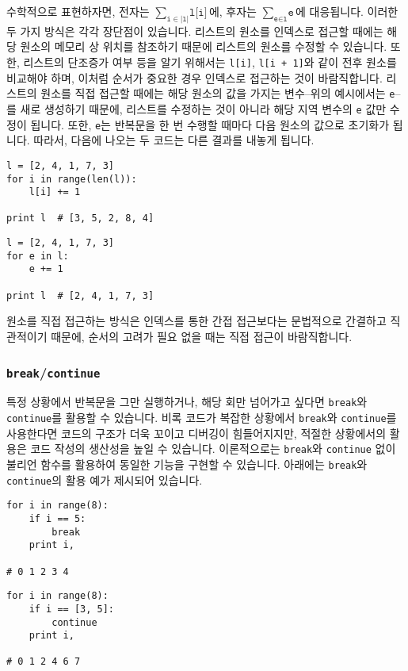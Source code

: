 \documentclass[../main.tex]{subfiles}
\begin{document}
수학적으로 표현하자면, 전자는 $\sum_{\texttt{i} \in |\texttt{l}|} \texttt{l[i]}$에, 후자는 $\sum_{\texttt{e} \in \texttt{l}} \texttt{e}$에 대응됩니다. 이러한 두 가지 방식은 각각 장단점이 있습니다.
리스트의 원소를 인덱스로 접근할 때에는 해당 원소의 메모리 상 위치를 참조하기 때문에 리스트의 원소를 수정할 수 있습니다.
또한, 리스트의 단조증가 여부 등을 알기 위해서는 \texttt{l[i]}, \texttt{l[i + 1]}와 같이 전후 원소를 비교해야 하며, 이처럼 순서가 중요한 경우 인덱스로 접근하는 것이 바람직합니다.
리스트의 원소를 직접 접근할 때에는 해당 원소의 값을 가지는 변수--위의 예시에서는 \texttt{e}--를 새로 생성하기 때문에, 리스트를 수정하는 것이 아니라 해당 지역 변수의 \texttt{e} 값만 수정이 됩니다.
또한, \texttt{e}는 반복문을 한 번 수행할 때마다 다음 원소의 값으로 초기화가 됩니다.
따라서, 다음에 나오는 두 코드는 다른 결과를 내놓게 됩니다.
\begin{verbatim}
l = [2, 4, 1, 7, 3]
for i in range(len(l)):
	l[i] += 1

print l  # [3, 5, 2, 8, 4]
\end{verbatim}
\begin{verbatim}
l = [2, 4, 1, 7, 3]
for e in l:
	e += 1

print l  # [2, 4, 1, 7, 3]
\end{verbatim}
원소를 직접 접근하는 방식은 인덱스를 통한 간접 접근보다는 문법적으로 간결하고 직관적이기 때문에, 순서의 고려가 필요 없을 때는 직접 접근이 바람직합니다.

\subsubsection{\texttt{break}/\texttt{continue}}
특정 상황에서 반복문을 그만 실행하거나, 해당 회만 넘어가고 싶다면 \texttt{break}와 \texttt{continue}를 활용할 수 있습니다.
비록 코드가 복잡한 상황에서 \texttt{break}와 \texttt{continue}를 사용한다면 코드의 구조가 더욱 꼬이고 디버깅이 힘들어지지만, 적절한 상황에서의 활용은 코드 작성의 생산성을 높일 수 있습니다.
이론적으로는 \texttt{break}와 \texttt{continue} 없이 불리언 함수를 활용하여 동일한 기능을 구현할 수 있습니다.
아래에는 \texttt{break}와 \texttt{continue}의 활용 예가 제시되어 있습니다.
\begin{verbatim}
for i in range(8):
	if i == 5:
		break
	print i,

# 0 1 2 3 4
\end{verbatim}
\begin{verbatim}
for i in range(8):
	if i == [3, 5]:
		continue
	print i,

# 0 1 2 4 6 7
\end{verbatim}
\end{document}
